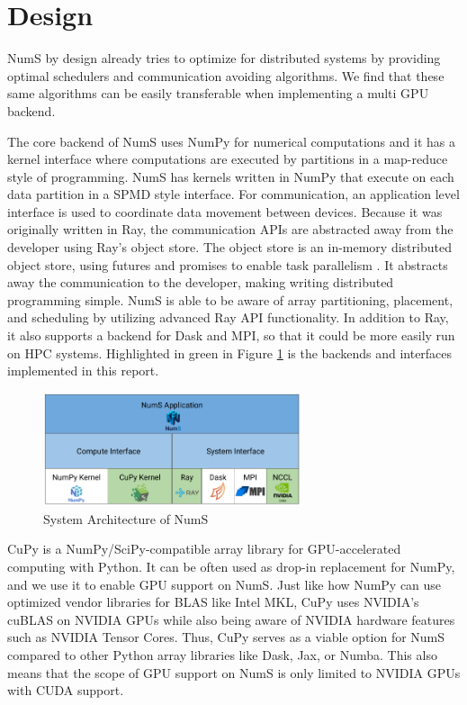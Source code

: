 \documentclass{article}
\begin{document}
\section{Design}
NumS by design already tries to optimize for distributed systems by providing optimal schedulers and communication avoiding algorithms. \cite{nums} We find that these same algorithms can be easily transferable when implementing a multi GPU backend.

The core backend of NumS uses NumPy for numerical computations and it has a kernel interface where computations are executed by partitions in a map-reduce style of programming. NumS has kernels written in NumPy that execute on each data partition in a SPMD style interface. For communication, an application level interface is used to coordinate data movement between devices. Because it was originally written in Ray, the communication APIs are abstracted away from the developer using Ray's object store. The object store is an in-memory distributed object store, using futures and promises to enable task parallelism \cite{ray}. It abstracts away the communication to the developer, making writing distributed programming simple. NumS is able to be aware of array partitioning, placement, and scheduling by utilizing advanced Ray API functionality. In addition to Ray, it also supports a backend for Dask and MPI, so that it could be more easily run on HPC systems. Highlighted in green in Figure \ref{fig:system_arch} is the backends and interfaces implemented in this report.

\begin{figure}
  \centerline{\includegraphics[width=3in]{figures/system_architecture.png}}
  \caption{System Architecture of NumS}
  \label{fig:system_arch}
\end{figure}

CuPy is a NumPy/SciPy-compatible array library for GPU-accelerated computing with Python. It can be often used as drop-in replacement for NumPy, and we use it to enable GPU support on NumS. \cite{cupy} Just like how NumPy can use optimized vendor libraries for BLAS like Intel MKL, CuPy uses NVIDIA's cuBLAS on NVIDIA GPUs while also being aware of NVIDIA hardware features such as NVIDIA Tensor Cores. Thus, CuPy serves as a viable option for NumS compared to other Python array libraries like Dask, Jax, or Numba. This also means that the scope of GPU support on NumS is only limited to NVIDIA GPUs with CUDA support.
\end{document}
